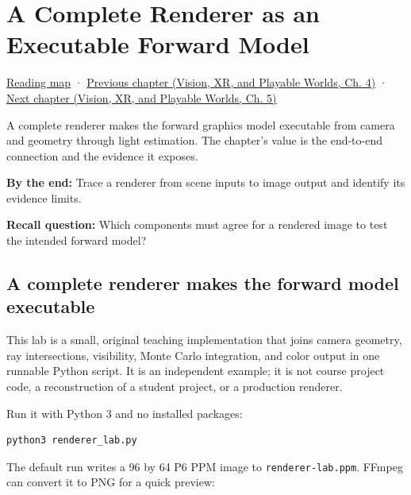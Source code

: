 \chapter{A Complete Renderer as an Executable Forward Model}\label{04-visual-computing-ii-ch035-a-complete-renderer-as-an-executable-forward-model}\hypertarget{04-visual-computing-ii-ch035}{}\label{stagechapter:04-visual-computing-ii-ch035}

\hyperref[volume-reading-map]{Reading map} · \href{../07-Vision-XR-and-Playable-Worlds/main.pdf\#nameddest=04-visual-computing-ii-ch034-learned-3d-shapes-and-scene-representations}{Previous chapter (Vision, XR, and Playable Worlds, Ch. 4)} · \href{../07-Vision-XR-and-Playable-Worlds/main.pdf\#nameddest=04-visual-computing-ii-ch036-source-atlas-and-reconstruction-checkpoints}{Next chapter (Vision, XR, and Playable Worlds, Ch. 5)}

A complete renderer makes the forward graphics model executable from camera and geometry through light estimation. The chapter's value is the end-to-end connection and the evidence it exposes.

\textbf{By the end:} Trace a renderer from scene inputs to image output and identify its evidence limits.

\textbf{Recall question:} Which components must agree for a rendered image to test the intended forward model?

\section{A complete renderer makes the forward model executable}\label{04-visual-computing-ii-ch035-a-complete-renderer-makes-the-forward-model-executable}

This lab is a small, original teaching implementation that joins camera geometry, ray intersections, visibility, Monte Carlo integration, and color output in one runnable Python script. It is an independent example; it is not course project code, a reconstruction of a student project, or a production renderer.

Run it with Python 3 and no installed packages:

\begin{verbatim}
python3 renderer_lab.py
\end{verbatim}

The default run writes a 96 by 64 P6 PPM image to \texttt{renderer-lab.ppm}. FFmpeg can convert it to PNG for a quick preview:

